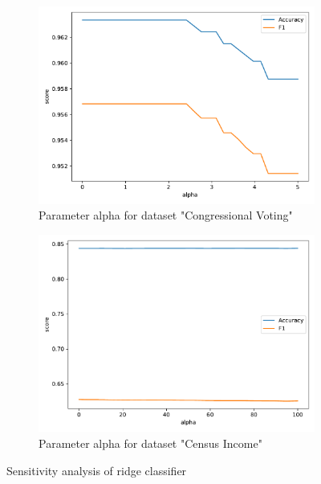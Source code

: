 \documentclass[a4paper,10pt]{article}
\begin{document}
\begin{figure}[h!]
    \captionsetup{justification=centering}
    \begin{subfigure}[b]{0.45\textwidth}
        \includegraphics[width=\textwidth]{congress/plots/RidgeClassifier_alpha_sensitivity_new.pdf}
        \caption{Parameter \textsf{alpha} for dataset "Congressional Voting"}
    \end{subfigure}
    \hfill
    \begin{subfigure}[b]{0.45\textwidth}
        \includegraphics[width=\textwidth]{census/plots/RidgeClassifier_alpha_sensitivity.pdf}
        \caption{Parameter \textsf{alpha} for dataset "Census Income"}
    \end{subfigure}
    \caption{Sensitivity analysis of ridge classifier}
    \label{fig: sensitivity ridge}
\end{figure}
\end{document}
